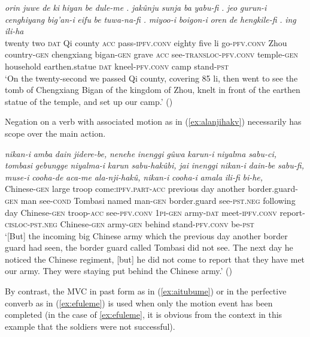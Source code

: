\documentclass{article}
\newcommand{\ipa}[1]{\textit{{\phon\mbox{#1}}}} %
\begin{document}
\begin{exe}
\ex \label{ex:tuwanafi}
\gll
\ipa{orin} 	\ipa{juwe} 	\ipa{de} 	\ipa{ki} 	\ipa{hiyan} 	\ipa{be} 	\ipa{dule-me} 	\ipa{.} 	\ipa{jakûnju} 	\ipa{sunja} 	\ipa{ba} 	\ipa{yabu-fi} 	\ipa{.} 	\ipa{jeo} 	\ipa{gurun-i} 	\ipa{cenghiyang} 	\ipa{big’an-i} 	\ipa{eifu} 	\ipa{be} 	\ipa{tuwa-na-fi} 	\ipa{.} 	\ipa{miyoo-i} 	\ipa{boigon-i} 	\ipa{oren} 	\ipa{de} 	\ipa{hengkile-fi} 	\ipa{.} 	\ipa{ing} 	\ipa{ili-ha} \\
twenty two \textsc{dat} Qi county \textsc{acc} pass-\textsc{ipfv.conv} { } eighty five li  go-\textsc{pfv.conv} { } Zhou country-\textsc{gen} chengxiang bigan-\textsc{gen} grave \textsc{acc} see-\textsc{transloc-pfv.conv} { } temple-\textsc{gen} household earthen.statue \textsc{dat} kneel-\textsc{pfv.conv} { } camp stand-\textsc{pst} \\
\glt `On the twenty-second we passed Qi county, covering 85 li, then went to see the tomb of Chengxiang Bigan of the kingdom of Zhou, knelt in front of the earthen statue of the temple, and set up our camp.' (\citealt[83/103]{cosmo06dzengseo})
\end{exe}

Negation on a verb with associated motion as in (\ref{ex:alanjihakv}) necessarily has scope over the main action.

\begin{exe}
\ex \label{ex:alanjihakv}
\gll \ipa{nikan-i} 	\ipa{amba} 	\ipa{dain} 	\ipa{jidere-be,} 	\ipa{nenehe} 	\ipa{inenggi} 	\ipa{gûwa} 	\ipa{karun-i} 	\ipa{niyalma} 	\ipa{sabu-ci,} 	\ipa{tombasi} 	\ipa{gebungge} 	\ipa{niyalma-i} 	\ipa{karun} 	\ipa{sabu-hakûbi,} 	\ipa{jai} 	\ipa{inenggi} 	\ipa{nikan-i} 	\ipa{dain-be} 	\ipa{sabu-fi,} 	\ipa{muse-i} 	\ipa{cooha-de} 	\ipa{aca-me} 	\ipa{ala-nji-hakû,} 	\ipa{nikan-i} 	\ipa{cooha-i} 	\ipa{amala} 	\ipa{ili-fi} 	\ipa{bi-he,} \\
Chinese-\textsc{gen} large troop come:\textsc{ipfv.part}-\textsc{acc} previous day another border.guard-\textsc{gen} man see-\textsc{cond} Tombasi named man-\textsc{gen} border.guard see-\textsc{pst.neg} following day Chinese-\textsc{gen} troop-\textsc{acc} see-\textsc{pfv.conv} \textsc{1pi-gen} army-\textsc{dat} meet-\textsc{ipfv.conv} report-\textsc{cisloc-pst.neg} Chinese-\textsc{gen} army-\textsc{gen} behind stand-\textsc{pfv.conv} be-\textsc{pst} \\
\glt ‘[But] the incoming big Chinese army which the previous day another border guard had seen, the border guard called Tombasi did not see. The next day he noticed the Chinese regiment, [but] he did not come to report that they have met our army. They were staying put behind the Chinese army.’ (\citealt[141, lines 5-8]{kanda55tongki})
\end{exe}
By contrast, the MVC in past form as in (\ref{ex:aitubume}) or in the perfective converb as in (\ref{ex:efuleme}) is used when only the motion event has been completed (in the case of \ref{ex:efuleme}, it is obvious from the context in this example that the soldiers were not successful).
\end{document}
